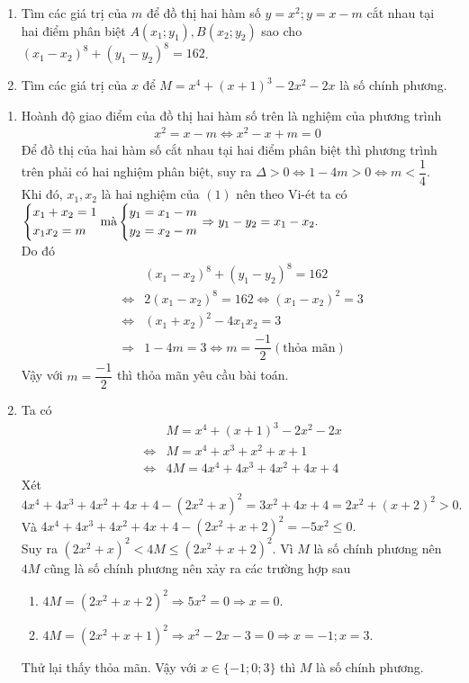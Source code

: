 \begin{ex}%
   \begin{enumerate}
   	\item Tìm các giá trị của $m$ để đồ thị hai hàm số $y= x^2; y= x- m$ cắt nhau tại hai điểm phân biệt $A(x_1; y_1), B(x_2; y_2)$ sao cho $(x_1- x_2)^8+ (y_1- y_2)^8= 162$.
   	\item Tìm các giá trị của $x$ để $M= x^4+ (x+1)^3- 2x^2- 2x$ là số chính phương.
   \end{enumerate}
\loigiai
    {
    \begin{enumerate}
    	\item Hoành độ giao điểm của đồ thị hai hàm số trên là nghiệm của phương trình
    	\begin{align*}
    	x^2= x-m \Leftrightarrow x^2- x+ m=0
    	\end{align*}
    	 Để đồ thị của hai hàm số cắt nhau tại hai điểm phân biệt thì phương trình trên phải có hai nghiệm phân biệt, suy ra $\Delta >0 \Leftrightarrow 1- 4m>0 \Leftrightarrow m< \dfrac{1}{4}$. Khi đó, $x_1, x_2$ là hai nghiệm của $(1)$ nên theo Vi-ét ta có $\left\{\begin{aligned}&x_1+ x_2= 1\\ &x_1x_2= m\end{aligned}\right. \text{mà} \left\{\begin{aligned}&y_1= x_1-m\\ &y_2= x_2- m\end{aligned}\right. \Rightarrow y_1- y_2= x_1- x_2.$\\
    	 Do đó 
    	 \begin{eqnarray*}
    	 	&& (x_1- x_2)^8+ (y_1- y_2)^8= 162\\
    	 	& \Leftrightarrow & 2(x_1- x_2)^8= 162 \Leftrightarrow (x_1- x_2)^2= 3\\
    	 	& \Leftrightarrow & (x_1+ x_2)^2- 4x_1x_2= 3\\
    	 	& \Rightarrow & 1- 4m= 3 \Leftrightarrow m= \dfrac{-1}{2} (\text{thỏa mãn})
    	\end{eqnarray*}
    	 Vậy với $m= \dfrac{-1}{2}$ thì thỏa mãn yêu cầu bài toán.
    	\item Ta có 
    	\begin{eqnarray*}
    	&& M= x^4+ (x+1)^3- 2x^2- 2x\\
    	& \Leftrightarrow & M= x^4+ x^3+ x^2+ x+ 1\\
    	& \Leftrightarrow & 4M= 4x^4+ 4x^3+ 4x^2+ 4x+ 4
    \end{eqnarray*}
    	Xét $4x^4+ 4x^3+ 4x^2+ 4x+ 4- (2x^2+ x)^2= 3x^2+ 4x+ 4= 2x^2 + (x+2)^2> 0.$\\
    	Và $4x^4+ 4x^3+ 4x^2+ 4x+ 4- (2x^2+ x+ 2)^2= -5x^2 \leq 0.$\\
    	Suy ra $(2x^2+ x)^2< 4M \leq (2x^2+ x+ 2)^2$. Vì $M$ là số chính phương nên $4M$ cũng là số chính phương nên xảy ra các trường hợp sau
    	\begin{enumerate}
    	\item $4M= (2x^2+ x+ 2)^2 \Rightarrow 5x^2= 0 \Rightarrow x= 0.$
    	\item $4M= (2x^2+ x+ 1)^2 \Rightarrow x^2- 2x- 3=0 \Rightarrow x=-1; x=3.$
    \end{enumerate}
    	Thử lại thấy thỏa mãn. Vậy với $x \in \{-1; 0; 3\}$ thì $M$ là số chính phương.
    \end{enumerate}
    }
\end{ex}
